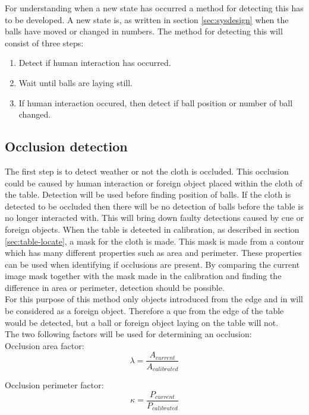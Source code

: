 For understanding when a new state has occurred a method for detecting this has to be developed. A new state is, as written in section \ref{sec:sysdesign} when the balls have moved or changed in numbers. The method for detecting this will consist of three steps:
\begin{enumerate}
	\item Detect if human interaction has occurred.
	\item Wait until balls are laying still.
	\item If human interaction occured, then detect if ball position or number of ball changed.
\end{enumerate}

\subsection{Occlusion detection}
The first step is to detect weather or not the cloth is occluded. This occlusion could be caused by human interaction or foreign object placed within the cloth of the table. Detection will be used before finding position of balls. If the cloth is detected to be occluded then there will be no detection of balls before the table is no longer interacted with. This will bring down faulty detections caused by cue or foreign objects. When the table is detected in calibration, as described in section \ref{sec:table-locate}, a mask for the cloth is made. This mask is made from a contour which has many different properties such as area and perimeter. These properties can be used when identifying if occlusions are present. By comparing the current image mask together with the mask made in the calibration and finding the difference in area or perimeter, detection should be possible.\\

For this purpose of this method only objects introduced from the edge and in will be considered as a foreign object. Therefore a que from the edge of the table would be detected, but a ball or foreign object laying on the table will not.\\

The two following factors will be used for determining an occlusion:\\

Occlusion area factor:
\begin{equation}
\lambda = \frac{A_{current}}{A_{calibrated}}
\label{eq:area}
\end{equation}

Occlusion perimeter factor:
\begin{equation}
\kappa = \frac{P_{current}}{P_{calibrated}}
\label{eq:perimeter}
\end{equation}

